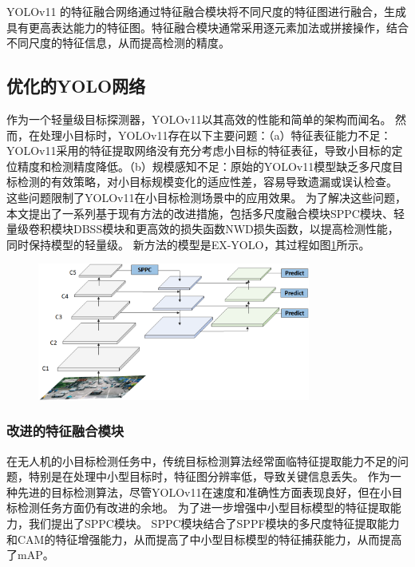 YOLOv11 的特征融合网络通过特征融合模块将不同尺度的特征图进行融合，生成具有更高表达能力的特征图。特征融合模块通常采用逐元素加法或拼接操作，结合不同尺度的特征信息，从而提高检测的精度。

\subsection{优化的YOLO网络}

作为一个轻量级目标探测器，YOLOv11以其高效的性能和简单的架构而闻名。 然而，在处理小目标时，YOLOv11存在以下主要问题：（a）特征表征能力不足：YOLOv11采用的特征提取网络没有充分考虑小目标的特征表征，导致小目标的定位精度和检测精度降低。（b）规模感知不足：原始的YOLOv11模型缺乏多尺度目标检测的有效策略，对小目标规模变化的适应性差，容易导致遗漏或误认检查。 这些问题限制了YOLOv11在小目标检测场景中的应用效果。 
为了解决这些问题，本文提出了一系列基于现有方法的改进措施，包括多尺度融合模块SPPC模块、轻量级卷积模块DBSS模块和更高效的损失函数NWD损失函数，以提高检测性能，同时保持模型的轻量级。 
新方法的模型是EX-YOLO，其过程如图\ref{fig:ex_yolo}所示。

\begin{figure}[htb]
    \centering
    \includegraphics[width=0.8\textwidth]{../figure/EX-YOLO.png}
    \captionsetup{font=footnotesize}
    \label{fig:ex_yolo}
\end{figure}

\subsubsection{改进的特征融合模块}

在无人机的小目标检测任务中，传统目标检测算法经常面临特征提取能力不足的问题，特别是在处理中小型目标时，特征图分辨率低，导致关键信息丢失。 
作为一种先进的目标检测算法，尽管YOLOv11在速度和准确性方面表现良好，但在小目标检测任务方面仍有改进的余地。 
为了进一步增强中小型目标模型的特征提取能力，我们提出了SPPC模块。
SPPC模块结合了SPPF模块的多尺度特征提取能力和CAM的特征增强能力，从而提高了中小型目标模型的特征捕获能力，从而提高了mAP。

